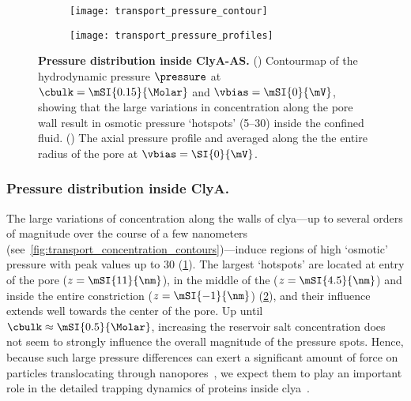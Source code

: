 %
\begin{figure*}[t]
  \centering
  
  \begin{subfigure}[t]{6cm}
    \centering
    \caption{}\vspace{-3mm}\label{fig:transport_pressure_contour}
    \texttt{[image: transport\_pressure\_contour]}
  \end{subfigure}
  \hspace{-5mm}
  \begin{subfigure}[t]{4.5cm}
    \centering
    \caption{}\vspace{-3mm}\label{fig:transport_pressure_profiles}
    \texttt{[image: transport\_pressure\_profiles]}
  \end{subfigure}

  \caption[Pressure distribution inside {ClyA-AS}.]
  {%
    \textbf{Pressure distribution inside {ClyA-AS}.}
    ()
    Contourmap of the hydrodynamic pressure $\pressure$ at $\cbulk = \mSI{0.15}{\Molar}$ and
    $\vbias=\mSI{0}{\mV}$, showing that the large variations in \Na{} concentration along the pore wall result
    in osmotic pressure `hotspots' (\SIrange{5}{30}{\atm}) inside the confined fluid.
    ()
    The axial pressure profile and averaged along the the entire radius of the pore at $\vbias=\SI{0}{\mV}$.
  }\label{fig:transport_pressure}

\end{figure*}
%


\subsubsection{Pressure distribution inside ClyA.}
%
The large variations of \Na{} concentration along the walls of \gls{clya}---up to several orders of magnitude
over the course of a few nanometers (see~\cref{fig:transport_concentration_contours})---induce regions of high
`osmotic' pressure with peak values up to \SI{30}{\atm} (\cref{fig:transport_pressure_contour}). The largest
`hotspots' are located at \cisi{} entry of the pore ($z = \mSI{11}{\nm}$), in the middle of the \lumen{} ($z =
\mSI{4.5}{\nm}$) and inside the entire constriction ($z = \mSI{-1}{\nm}$)
(\cref{fig:transport_pressure_profiles}), and their influence extends well towards the center of the pore. Up
until $\cbulk \approx \mSI{0.5}{\Molar}$, increasing the reservoir salt concentration does not seem to
strongly influence the overall magnitude of the pressure spots. Hence, because such large pressure differences
can  exert a significant amount of force on particles translocating through nanopores~\cite{Hoogerheide-2014},
we expect them to play an important role in the detailed trapping dynamics of proteins inside
\gls{clya}~\cite{Soskine-Biesemans-2015,Willems-Ruic-Biesemans-2019}.


